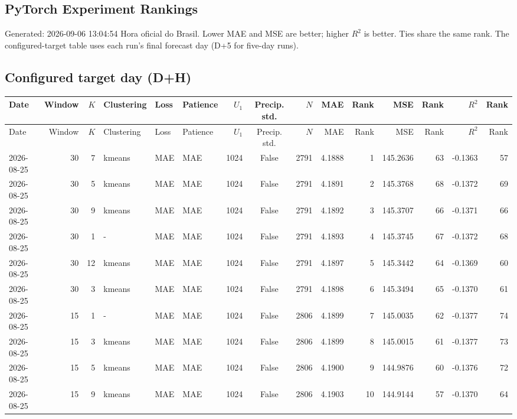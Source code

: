 \documentclass[10pt]{article}
\begin{document}
\begin{landscape}
\section*{PyTorch Experiment Rankings}
Generated: 2026-09-06 13:04:54 Hora oficial do Brasil. Lower MAE and MSE are better; higher $R^2$ is better. Ties share the same rank. The configured-target table uses each run's final forecast day (D+5 for five-day runs).
\subsection*{Configured target day (D+H)}
\footnotesize
\setlength{\tabcolsep}{3pt}
\begin{longtable}{@{}lrrlllrcrrrrrrr@{}}
\toprule
Date & Window & $K$ & Clustering & Loss & Patience & $U_1$ & Precip. std. & $N$ & MAE & Rank & MSE & Rank & $R^2$ & Rank \\
\midrule
\endfirsthead
\toprule
Date & Window & $K$ & Clustering & Loss & Patience & $U_1$ & Precip. std. & $N$ & MAE & Rank & MSE & Rank & $R^2$ & Rank \\
\midrule
\endhead
2026-08-25 & 30 & 7 & kmeans & MAE & MAE & 1024 & False & 2791 & 4.1888 & 1 & 145.2636 & 63 & -0.1363 & 57 \\
2026-08-25 & 30 & 5 & kmeans & MAE & MAE & 1024 & False & 2791 & 4.1891 & 2 & 145.3768 & 68 & -0.1372 & 69 \\
2026-08-25 & 30 & 9 & kmeans & MAE & MAE & 1024 & False & 2791 & 4.1892 & 3 & 145.3707 & 66 & -0.1371 & 66 \\
2026-08-25 & 30 & 1 & - & MAE & MAE & 1024 & False & 2791 & 4.1893 & 4 & 145.3745 & 67 & -0.1372 & 68 \\
2026-08-25 & 30 & 12 & kmeans & MAE & MAE & 1024 & False & 2791 & 4.1897 & 5 & 145.3442 & 64 & -0.1369 & 60 \\
2026-08-25 & 30 & 3 & kmeans & MAE & MAE & 1024 & False & 2791 & 4.1898 & 6 & 145.3494 & 65 & -0.1370 & 61 \\
2026-08-25 & 15 & 1 & - & MAE & MAE & 1024 & False & 2806 & 4.1899 & 7 & 145.0035 & 62 & -0.1377 & 74 \\
2026-08-25 & 15 & 3 & kmeans & MAE & MAE & 1024 & False & 2806 & 4.1899 & 8 & 145.0015 & 61 & -0.1377 & 73 \\
2026-08-25 & 15 & 5 & kmeans & MAE & MAE & 1024 & False & 2806 & 4.1900 & 9 & 144.9876 & 60 & -0.1376 & 72 \\
2026-08-25 & 15 & 9 & kmeans & MAE & MAE & 1024 & False & 2806 & 4.1903 & 10 & 144.9144 & 57 & -0.1370 & 64 \\

\end{longtable}
\end{landscape}
\end{document}
